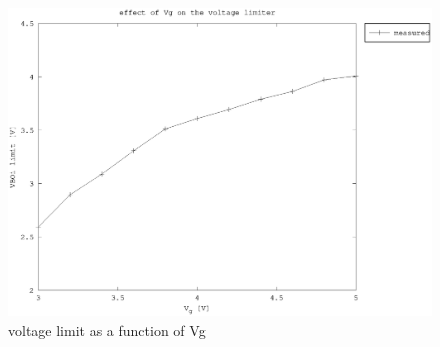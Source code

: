 \begin{figure}[h]
    \centering
    \includegraphics[width=\textwidth]{fig/vg_vs_vbo.eps}
    \caption  {voltage limit as a function of Vg}    
    \label{fig:vg_vs_vbo}
\end{figure}

